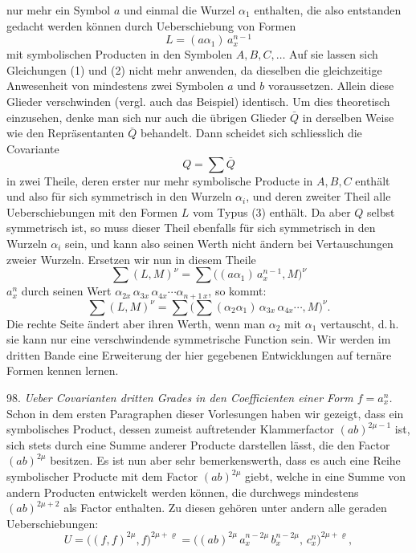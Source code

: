 \documentclass[11pt]{article}
\providecommand{\weberpage}[1]{}
\providecommand{\weq}[2]{\begin{equation}\tag{#1}#2\end{equation}}
\begin{document}
\weberpage{105}
nur mehr ein Symbol $a$ und einmal die Wurzel $\alpha_1$ enthalten, die
also entstanden gedacht werden können durch Ueberschiebung von
Formen
\weq{3}{L = (a\alpha_1)\,a_x^{n-1}}
mit symbolischen Producten in den Symbolen $A, B, C, \dots$ Auf sie
lassen sich Gleichungen (1) und (2) nicht mehr anwenden, da dieselben
die gleichzeitige Anwesenheit von mindestens zwei Symbolen
$a$ und $b$ voraussetzen. Allein diese Glieder verschwinden (vergl.
auch das Beispiel) identisch. Um dies theoretisch einzusehen, denke man
sich nur auch die übrigen Glieder $\bar Q$ in derselben Weise wie den
Repräsentanten $\bar Q$ behandelt. Dann scheidet sich schliesslich die
Covariante
\[
Q = \sum \bar Q
\]
in zwei Theile, deren erster nur mehr symbolische Producte in $A, B, C$
enthält und also für sich symmetrisch in den Wurzeln $\alpha_i$, und deren
zweiter Theil alle Ueberschiebungen mit den Formen $L$ vom Typus
(3) enthält. Da aber $Q$ selbst symmetrisch ist, so muss dieser Theil
ebenfalls für sich symmetrisch in den Wurzeln $\alpha_i$ sein, und kann also
seinen Werth nicht ändern bei Vertauschungen zweier Wurzeln. Ersetzen
wir nun in diesem Theile
\[
\sum (L, M)^\nu = \sum \big((a\alpha_1)\,a_x^{n-1}, M\big)^\nu
\]
$a_x^n$ durch seinen Wert $\alpha_{2x}\,\alpha_{3x}\,\alpha_{4x}\cdots\alpha_{n+1\,x}$, so kommt:
\[
\sum (L, M)^\nu = \sum \Big( \sum (\alpha_2\alpha_1)\,\alpha_{3x}\,\alpha_{4x}\cdots, M \Big)^\nu.
\]
Die rechte Seite ändert aber ihren Werth, wenn man $\alpha_2$ mit $\alpha_1$
vertauscht, d.\,h. sie kann nur eine verschwindende symmetrische
Function sein. Wir werden im dritten Bande eine Erweiterung der hier
gegebenen Entwicklungen auf ternäre Formen kennen lernen.

98. \textit{Ueber Covarianten dritten Grades in den Coefficienten einer
Form $f = a_x^n$.} Schon in dem ersten Paragraphen dieser Vorlesungen
haben wir gezeigt, dass ein symbolisches Product, dessen zumeist
auftretender Klammerfactor $(ab)^{2\mu-1}$ ist, sich stets durch eine Summe
anderer Producte darstellen lässt, die den Factor $(ab)^{2\mu}$ besitzen. Es
ist nun aber sehr bemerkenswerth, dass es auch eine Reihe symbolischer
Producte mit dem Factor $(ab)^{2\mu}$ giebt, welche in eine Summe
von andern Producten entwickelt werden können, die durchwegs
mindestens $(ab)^{2\mu+2}$ als Factor enthalten. Zu diesen gehören unter
andern alle geraden Ueberschiebungen:
\[
U = \big((f,f)^{2\mu}, f\big)^{2\mu+\varrho} = \big((ab)^{2\mu}\,a_x^{n-2\mu}\,b_x^{n-2\mu},\, c_x^n\big)^{2\mu+\varrho}, %
\]
\end{document}
